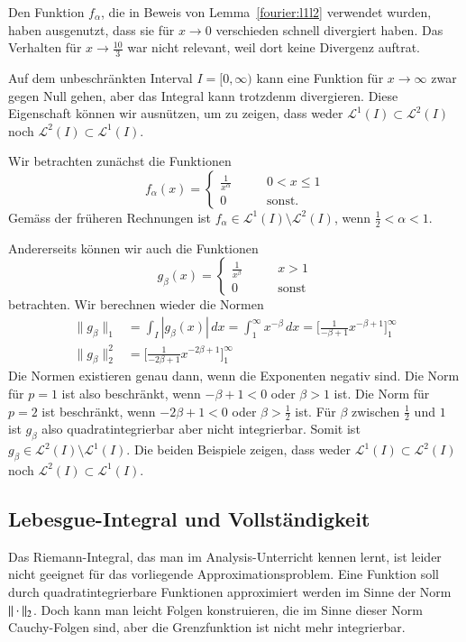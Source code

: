 \begin{beispiel}
Den Funktion $f_\alpha$, die in Beweis von Lemma~\ref{fourier:l1l2}
verwendet wurden, haben ausgenutzt, dass sie für $x\to 0$ verschieden 
schnell divergiert haben.
Das Verhalten für $x\to \frac{10}3$ war nicht relevant, weil dort keine
Divergenz auftrat.

Auf dem unbeschränkten Interval $I=[0,\infty)$ kann eine Funktion 
für $x\to\infty$ zwar gegen Null gehen, aber das Integral kann trotzdenm
divergieren.
Diese Eigenschaft können wir ausnützen, um zu zeigen, dass weder
$\mathcal{L}^1(I)\subset\mathcal{L}^2(I)$
noch
$\mathcal{L}^2(I)\subset\mathcal{L}^1(I)$.

Wir betrachten zunächst die Funktionen
\[
f_\alpha(x) = \begin{cases}
\displaystyle\frac1{x^\alpha}&\qquad0<x\le 1\\
0&\qquad\text{sonst.}
\end{cases}
\]
Gemäss der früheren Rechnungen ist
$f_\alpha\in\mathcal{L}^1(I)\setminus\mathcal{L}^2(I)$,
wenn $\frac12<\alpha<1$.

Andererseits können wir auch die Funktionen
\[
g_\beta(x)
=
\begin{cases}
\displaystyle\frac1{x^\beta}&\qquad x>1\\
0&\qquad\text{sonst}
\end{cases}
\]
betrachten.
Wir berechnen wieder die Normen
\begin{align*}
\| g_\beta\|_1
&=
\int_I|g_\beta(x)|\,dx
=
\int_1^\infty x^{-\beta}\,dx
=
\biggl[
\frac1{-\beta+1}x^{-\beta+1}
\biggr]_1^\infty
\\
\|g_\beta\|_2^2
&=
\biggl[
\frac1{-2\beta+1}x^{-2\beta+1}
\biggr]_1^\infty
\end{align*}
Die Normen existieren genau dann, wenn die Exponenten negativ sind.
Die Norm für $p=1$ ist also beschränkt, wenn $-\beta+1<0$ oder $\beta > 1$
ist.
Die Norm für $p=2$ ist beschränkt, wenn $-2\beta+1<0$ oder $\beta > \frac12$
ist.
Für $\beta$ zwischen $\frac12$ und $1$ ist $g_\beta$ also quadratintegrierbar
aber nicht integrierbar.
Somit ist $g_\beta\in\mathcal{L}^2(I)\setminus\mathcal{L}^1(I)$.
Die beiden Beispiele zeigen, dass weder
$\mathcal{L}^1(I)\subset\mathcal{L}^2(I)$
noch
$\mathcal{L}^2(I)\subset\mathcal{L}^1(I)$.
\end{beispiel}


\subsection{Lebesgue-Integral und Vollständigkeit}
Das Riemann-Integral, das man im Analysis-Unterricht kennen lernt, 
ist leider nicht geeignet für das vorliegende Approximationsproblem.
Eine Funktion soll durch quadratintegrierbare Funktionen approximiert
werden im Sinne der Norm $\|\mathstrut\cdot\mathstrut\|_2$.
Doch kann man leicht Folgen konstruieren, die im Sinne dieser Norm
Cauchy-Folgen sind, aber die Grenzfunktion ist nicht mehr integrierbar.

